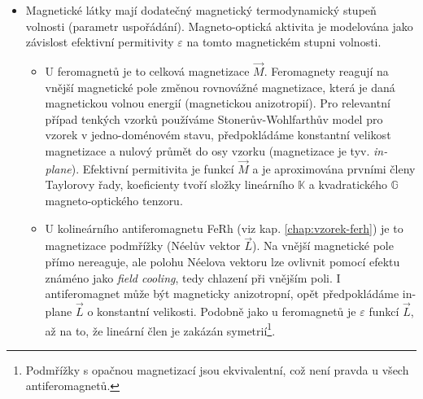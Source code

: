\begin{itemize}
    \item 
        Magnetické látky mají dodatečný magnetický termodynamický stupeň volnosti (parametr uspořádání).
        Magneto-optická aktivita je modelována jako závislost efektivní permitivity $\varepsilon$ na tomto magnetickém stupni volnosti.
        \begin{itemize}
            \item 
                U feromagnetů je to celková magnetizace $\vec{M}$. 
                Feromagnety reagují na vnější magnetické pole změnou rovnovážné magnetizace, která je daná magnetickou volnou energií (magnetickou anizotropií).
                Pro relevantní případ tenkých vzorků používáme Stonerův-Wohlfarthův model\todocite{} pro vzorek v jedno-doménovém stavu, předpokládáme konstantní velikost magnetizace a nulový průmět do osy vzorku (magnetizace je tyv. \emph{in-plane}).
                Efektivní permitivita je funkcí $\vec{M}$ a je aproximována prvními členy Taylorovy řady, koeficienty tvoří složky lineárního $\mathbb{K}$ a kvadratického $\mathbb{G}$ magneto-optického tenzoru.
            \item
                U kolineárního antiferomagnetu FeRh (viz kap. \ref{chap:vzorek-ferh}) je to magnetizace podmřížky (Néelův vektor $\vec{L}$).
                Na vnější magnetické pole přímo nereaguje, ale polohu Néelova vektoru lze ovlivnit pomocí efektu známéno jako \emph{field cooling}, tedy chlazení při vnějším poli.
                I antiferomagnet může být magneticky anizotropní, opět předpokládáme in-plane $\vec{L}$ o konstantní velikosti.
                Podobně jako u feromagnetů je $\varepsilon$ funkcí $\vec{L}$, až na to, že lineární člen je zakázán symetrií\footnote{Podmřížky s opačnou magnetizací jsou ekvivalentní, což není pravda u všech antiferomagnetů.}.
        \end{itemize}
\end{itemize}
